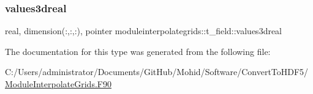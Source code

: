 \mbox{\label{structmoduleinterpolategrids_1_1t__field_afa90ea6f3b62bcfa73f2a3824cbc72d5}} 
\subsubsection{\texorpdfstring{values3dreal}{values3dreal}}
{\footnotesize\ttfamily real, dimension(\+:,\+:,\+:), pointer moduleinterpolategrids\+::t\+\_\+field\+::values3dreal\hspace{0.3cm}{\ttfamily [private]}}



The documentation for this type was generated from the following file\+:\begin{DoxyCompactItemize}
\item 
C\+:/\+Users/administrator/\+Documents/\+Git\+Hub/\+Mohid/\+Software/\+Convert\+To\+H\+D\+F5/\mbox{\hyperlink{_module_interpolate_grids_8_f90}{Module\+Interpolate\+Grids.\+F90}}\end{DoxyCompactItemize}
